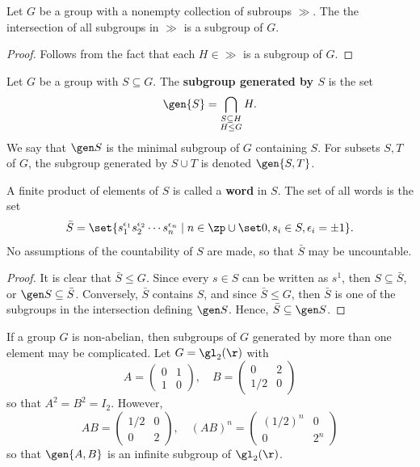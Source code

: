  \label{prop2.8}
Let $G$ be a group with a nonempty collection of subroups $\gg$. The the intersection of all subgroups in $\gg$ is a subgroup of $G$.
\begin{proof}
    Follows from the fact that each $H \in \gg$ is a subgroup of $G$.
\end{proof}

 Let $G$ be a group with $S \subseteq G$. The \textbf{subgroup generated by $S$} is the set
\[\gen{S} = \bigcap_{\substack{S \subseteq H \\ H \leq G}} H.\]
We say that $\gen S$ is the minimal subgroup of $G$ containing $S$. For subsets $S, T$ of $G$, the subgroup generated by $S \cup T$ is denoted $\gen{S, T}$.

 A finite product of elements of $S$ is called a \textbf{word} in $S$. The set of all words is the set
\[\bar S = \set{s_1^{\epsilon_1} s_2^{\epsilon_2} \cdots s_n^{\epsilon_n} \mid n \in \zp \cup \set 0, s_i \in S, \epsilon_i = \pm 1}.\]
No assumptions of the countability of $S$ are made, so that $\bar S$ may be uncountable.

\prop[$\bar S = \gen S$] \label{prop2.9} \uspace
\begin{proof}
    It is clear that $\bar S \leq G$. Since every $s \in S$ can be written as $s^1$, then $S \subseteq \bar S$, or $\gen S \subseteq \bar S$. Conversely, $\bar S$ contains $S$, and since $\bar S \leq G$, then $\bar S$ is one of the subgroups in the intersection defining $\gen S$. Hence, $\bar S \subseteq \gen S$.
\end{proof}

\ex If a group $G$ is non-abelian, then subgroups of $G$ generated by more than one element may be complicated. Let $G = \gl_2(\r)$ with
\[A = 
\begin{pmatrix}
    0 & 1 \\
    1 & 0
\end{pmatrix}, \quad
B = 
\begin{pmatrix}
    0 & 2 \\
    1/2 & 0
\end{pmatrix}\]
so that $A^2 = B^2 = I_2$. However,
\[AB =
\begin{pmatrix}
    1/2 & 0 \\
    0 & 2
\end{pmatrix}, \quad 
(AB)^n =
\begin{pmatrix}
    (1/2)^n & 0 \\
    0 & 2^n
\end{pmatrix}\]
so that $\gen{A, B}$ is an infinite subgroup of $\gl_2(\r)$.
\newpage

